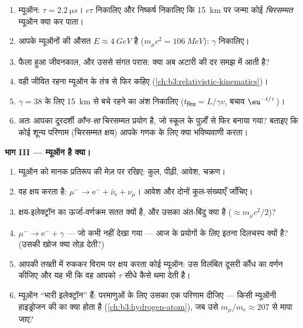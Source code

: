 \begin{problem}
\begin{enumerate}[resume]
  \item म्यूऑन: $\tau = \qty{2.2}{\micro s}$। $c\tau$ निकालिए और
        निष्कर्ष निकालिए कि \qty{15}{km} पर जन्मा कोई
        \emph{चिरसम्मत} म्यूऑन क्या कर पाता।
  \item आपके म्यूऑनों की औसत $E \approx \qty{4}{GeV}$ है
        ($m_\mu c^2 = \qty{106}{MeV}$): $\gamma$ निकालिए।
  \item फैला हुआ जीवनकाल, और उससे संगत परास: क्या अब अटारी की दर
        समझ में आती है?
  \item वही जीवित रहना म्यूऑन के तंत्र से फिर कहिए
        (\cref{ch:b3:relativistic-kinematics})।
  \item $\gamma = 38$ के लिए \qty{15}{km} से बचे रहने का अंश
        निकालिए ($t_{\text{निज}} = L/\gamma v$, बचाव
        $\eu^{-t/\tau}$)।
  \item अतः आपका दूरदर्शी \emph{कौन-सा} चिरसम्मत प्रयोग है, जो
        स्कूल के पुर्ज़ों से फिर बनाया गया? बताइए कि कोई शून्य
        परिणाम (चिरसम्मत क्षय) आपके गणक के लिए क्या भविष्यवाणी करता।
\end{enumerate}

\medskip\noindent\textbf{भाग III --- म्यूऑन है क्या।}

\begin{enumerate}[resume]
  \item म्यूऑन को मानक प्रतिरूप की मेज़ पर रखिए: कुल, पीढ़ी,
        आवेश, चक्रण।
  \item वह क्षय करता है: $\mu^- \to \text{e}^- + \bar\nu_{\text{e}} +
        \nu_\mu$। आवेश और दोनों  कुल-संख्याएँ जाँचिए।
  \item क्षय-इलेक्ट्रॉन का ऊर्जा-वर्णक्रम सतत क्यों है,
        और उसका अंत-बिंदु क्या है ($\approx m_\mu c^2/2$)?
  \item $\mu^- \to \text{e}^- + \gamma$ --- जो कभी नहीं देखा गया
        --- आज के प्रयोगों के लिए इतना दिलचस्प क्यों है?
        (उसकी खोज क्या तोड़ देती?)
  \item आपकी तख्ती में रुककर विराम पर क्षय करता कोई म्यूऑन: उस
        विलंबित दूसरी कौंध का वर्णन कीजिए और यह भी कि वह आपको
        $\tau$ सीधे कैसे थमा देती है।
  \item म्यूऑन ``भारी इलेक्ट्रॉन'' हैं: परमाणुओं के लिए उसका एक
        परिणाम दीजिए --- किसी म्यूऑनी हाइड्रोजन की  का क्या होता है (\cref{ch:b3:hydrogen-atom}), जब
        उसे $m_\mu/m_{\text{e}} \approx 207$ से मापा जाए?
\end{enumerate}


\end{problem}
